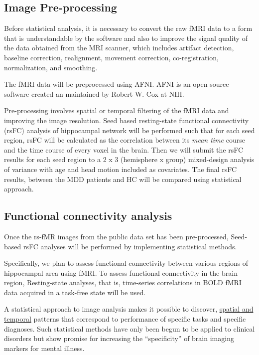 \documentclass{article}
\begin{document}
\subsection{Image Pre-processing}

Before statistical analysis, it is necessary to convert the raw fMRI
data to a form that is understandable by the software and also to
improve the signal quality of the data obtained from the MRI scanner,
which includes artifact detection, baseline correction, realignment,
movement correction, co-registration, normalization, and smoothing.

The fMRI data will be preprocessed using AFNI. AFNI is an open source
software created an maintained by Robert W. Cox at NIH.

Pre-processing involves spatial or temporal filtering of the fMRI data
and improving the image resolution. Seed based resting-state
functional connectivity (rsFC) analysis of hippocampal network will be
performed such that for each seed region, rsFC will be calculated as
the correlation between its \textit{mean time} course and the time
course of every voxel in the brain. Then we will submit the rsFC
results for each seed region to a 2 x 3 (hemisphere x group)
mixed-design analysis of variance with age and head motion included as
covariates. The final rsFC results, between the MDD patients and HC
will be compared using statistical approach.


\subsection{Functional connectivity analysis}

Once the rs-fMR images from the public data set has been
pre-processed, Seed- based rsFC analyses will be performed by
implementing statistical methods.

Specifically, we plan to assess functional connectivity between
various regions of hippocampal area using fMRI. To assess functional
connectivity in the brain region, Resting-state analyses, that is,
time-series correlations in BOLD fMRI data acquired in a task-free
state will be used.

A statistical approach to image analysis makes it possible to
discover, \underline{spatial and temporal} patterns that correspond to
performance of specific tasks and specific diagnoses. Such statistical
methods have only been begun to be applied to clinical disorders but
show promise for increasing the ``specificity'' of brain imaging
markers for mental illness.
\end{document}
